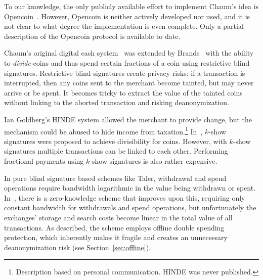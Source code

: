 \documentclass[sigconf, authordraft]{acmart}
\begin{document}
To our knowledge, the only publicly available effort to implement
Chaum's idea is Opencoin~\cite{dent2008extensions}.  However, Opencoin
is neither actively developed nor used, and it is not clear
to what degree the implementation is even complete.  Only a partial
description of the Opencoin protocol is available to date.

Chaum's original digital cash system~\cite{chaum1983blind} was
extended by Brands~\cite{brands1993efficient} with the ability to {\em
  divide} coins and thus spend certain fractions of a coin using
restrictive blind signatures.  Restrictive blind signatures create
privacy risks: if a transaction is interrupted, then any coins sent
to the merchant become tainted, but may never arrive or be spent.
It becomes tricky to extract the value of the tainted coins without
linking to the aborted transaction and risking deanonymization.

Ian Goldberg's HINDE system allowed the merchant to provide change,
but the mechanism could be abused to hide income from
taxation.\footnote{Description based on personal communication. HINDE
  was never published.}
In~\cite{brands1993efficient}, $k$-show signatures were proposed to
achieve divisibility for coins.  However, with $k$-show signatures
multiple transactions can be linked to each other.
Performing fractional payments using $k$-show signatures is also
rather expensive.

In pure blind signature based schemes like Taler, withdrawal and spend
operations require bandwidth logarithmic in the value being withdrawn
or spent.  In~\cite{Camenisch05compacte-cash}, there is a zero-knowledge
scheme that improves upon this, requiring only constant bandwidth for
withdrawals and spend operations, but unfortunately the exchanges' storage and
search costs become linear in the total value of all transactions.
As described, the scheme employs offline double spending protection,
which inherently makes it fragile and creates an unnecessary
deanonymization risk (see Section~\ref{sec:offline}).
%
%
\end{document}
